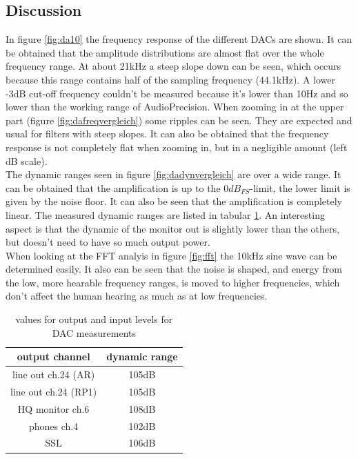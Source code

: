 \documentclass[11pt]{report}
\begin{document}
	\subsection{Discussion}
In figure \ref{fig:da10} the frequency response of the different DACs are shown. It can be obtained that the amplitude distributions are almost flat over the whole frequency range. At about 21kHz a steep slope down can be seen, which occurs because this range contains half of the sampling frequency (44.1kHz). A lower -3dB cut-off frequency couldn't be measured because it's lower than 10Hz and so lower than the working range of AudioPrecision. When zooming in at the upper part (figure \ref{fig:dafreqvergleich}) some ripples can be seen. They are expected and usual for filters with steep slopes. It can also be obtained that the frequency response is not completely flat when zooming in, but in a negligible amount (left dB scale).\\
The dynamic ranges seen in figure \ref{fig:dadynvergleich} are over a wide range. It can be obtained that the amplification is up to the $0dB_{FS}$-limit, the lower limit is given by the noise floor. It can also be seen that the amplification is completely linear. The measured dynamic ranges are listed in tabular \ref{tab:dadynrange}. An interesting aspect is that the dynamic of the monitor out is slightly lower than the others, but doesn't need to have so much output power.\\
When looking at the FFT analyis in figure \ref{fig:fft} the 10kHz sine wave can be determined easily. It also can be seen that the noise is shaped, and energy from the low, more hearable frequency ranges, is moved to higher frequencies, which don't affect the human hearing as much as at low frequencies.
\begin{table}
\begin{center}
\begin{tabular}{|c|c|}
\hline 
output channel  & 	dynamic range	\\	 \hline
line out ch.24 (AR) &	105dB \\
line out ch.24 (RP1) &	105dB \\
HQ monitor ch.6 &	108dB	\\
phones ch.4 &	102dB \\
SSL & 106dB \\
\hline
\end{tabular}
\caption{values for output and input levels for DAC measurements}
\label{tab:dadynrange}
\end{center}
\end{table}
\end{document}
